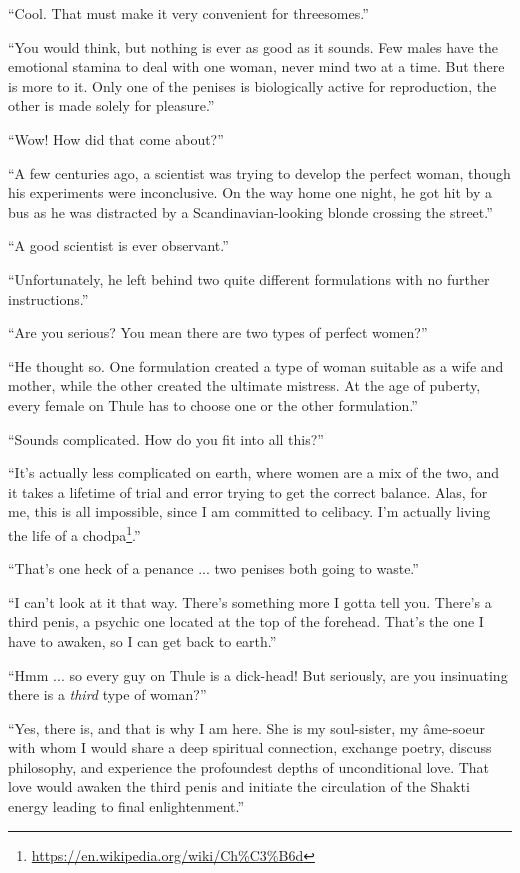 ``Cool. That must make it very convenient for threesomes.''

``You would think, but nothing is ever as good as it sounds. Few males have the emotional stamina to deal with one woman, never mind two at a time. But there is more to it. Only one of the penises is biologically active for reproduction, the other is made solely for pleasure.''

``Wow! How did that come about?''

``A few centuries ago, a scientist was trying to develop the perfect woman, though his experiments were inconclusive. On the way home one night, he got hit by a bus as he was distracted by a Scandinavian-looking blonde crossing the street.''

``A good scientist is ever observant.''

``Unfortunately, he left behind two quite different formulations with no further instructions.''

``Are you serious? You mean there are two types of perfect women?''

``He thought so. One formulation created a type of woman suitable as a wife and mother, while the other created the ultimate mistress. At the age of puberty, every female on Thule has to choose one or the other formulation.''

``Sounds complicated. How do you fit into all this?''

``It's actually less complicated on earth, where women are a mix of the two, and it takes a lifetime of trial and error trying to get the correct balance. Alas, for me, this is all impossible, since I am committed to celibacy. I'm actually living the life of a chodpa\footnote{\url{https://en.wikipedia.org/wiki/Ch\%C3\%B6d}}.''

``That's one heck of a penance ... two penises both going to waste.''

``I can't look at it that way. There's something more I gotta tell you. There's a third penis, a psychic one located at the top of the forehead. That's the one I have to awaken, so I can get back to earth.''

``Hmm ... so every guy on Thule is a dick-head! But seriously, are you insinuating there is a \emph{third} type of woman?''

``Yes, there is, and that is why I am here. She is my soul-sister, my âme-soeur with whom I would share a deep spiritual connection, exchange poetry, discuss philosophy, and experience the profoundest depths of unconditional love. That love would awaken the third penis and initiate the circulation of the Shakti energy leading to final enlightenment.''

